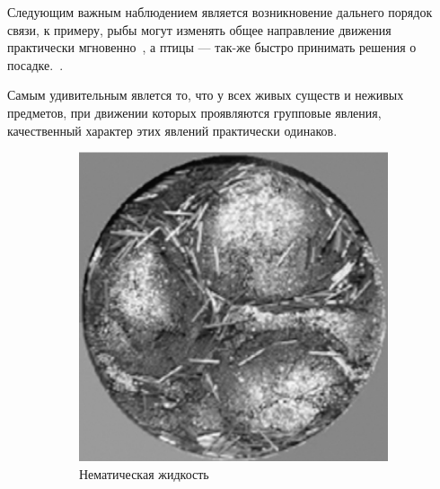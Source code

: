 	Следующим важным наблюдением является возникновение дальнего порядок связи, к примеру, рыбы могут изменять общее направление движения практически мгновенно~\cite{cambui2012}, а птицы --- так-же быстро принимать решения о посадке.~\cite{lukeman2010,major1978}.

	Самым удивительным явлется то, что у всех живых существ и неживых предметов, при движении которых проявляются групповые явления, качественный характер этих явлений практически одинаков.

	\begin{figure}
        \centering
        \begin{subfigure}{.4\columnwidth}
                \includegraphics[width=\columnwidth]{Images/Fig4_CollectiveMotion.png}
                \caption{Нематическая жидкость}
                \label{fig:CollMot:nematics}
        \end{subfigure}%
        ~ %
        \begin{subfigure}{.4\columnwidth}

\end{subfigure}
\end{figure}
